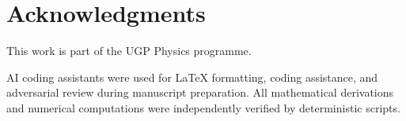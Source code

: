 \documentclass[10pt,twocolumn]{article}
\begin{document}
\section*{Acknowledgments}

This work is part of the UGP Physics programme.

AI coding assistants were used for \LaTeX{} formatting, coding assistance, and adversarial review during manuscript preparation. All mathematical derivations and numerical computations were independently verified by deterministic scripts.



\end{document}
